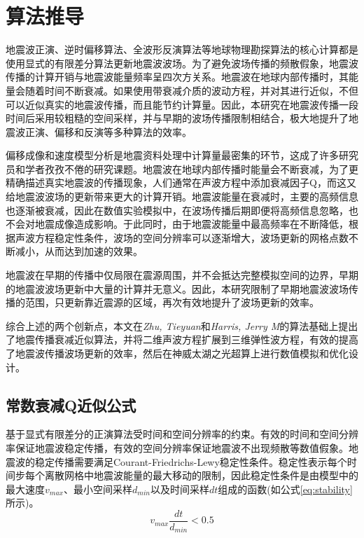 \documentclass[degree=doctor]{thuthesis}
\begin{document}
\section{算法推导}

地震波正演、逆时偏移算法、全波形反演算法等地球物理勘探算法的核心计算都是使用显式的有限差分算法更新地震波波场。为了避免波场传播的频散假象，地震波传播的计算开销与地震波能量频率呈四次方关系。地震波在地球内部传播时，其能量会随着时间不断衰减。如果使用带衰减介质的波动方程，并对其进行近似，不但可以近似真实的地震波传播，而且能节约计算量。因此，本研究在地震波传播一段时间后采用较粗糙的空间采样，并与早期的波场传播限制相结合，极大地提升了地震波正演、偏移和反演等多种算法的效率。

偏移成像和速度模型分析是地震资料处理中计算量最密集的环节，这成了许多研究员和学者孜孜不倦的研究课题\cite{bednar2002limited,stork2013eliminating}。地震波在地球内部传播时能量会不断衰减，为了更精确描述真实地震波的传播现象，人们通常在声波方程中添加衰减因子Q，而这又给地震波波场的更新带来更大的计算开销。地震波能量在衰减时，主要的高频信息也逐渐被衰减，因此在数值实验模拟中，在波场传播后期即便将高频信息忽略，也不会对地震成像造成影响。于此同时，由于地震波能量中最高频率在不断降低，根据声波方程稳定性条件，波场的空间分辨率可以逐渐增大，波场更新的网格点数不断减小，从而达到加速的效果。

地震波在早期的传播中仅局限在震源周围，并不会抵达完整模拟空间的边界，早期的地震波波场更新中大量的计算并无意义。因此，本研究限制了早期地震波波场传播的范围，只更新靠近震源的区域，再次有效地提升了波场更新的效率。

综合上述的两个创新点，本文在\emph{Zhu, Tieyuan}和\emph{Harris, Jerry M}\cite{zhu2014modeling}的算法基础上提出了地震传播衰减近似算法，并将二维声波方程扩展到三维弹性波方程，有效的提高了地震波传播波场更新的效率，然后在神威太湖之光超算上进行数值模拟和优化设计。

\subsection{常数衰减Q近似公式}

基于显式有限差分的正演算法受时间和空间分辨率的约束。有效的时间和空间分辨率保证地震波稳定传播，有效的空间分辨率保证地震波不出现频散等数值假象。地震波的稳定传播需要满足Courant-Friedrichs-Lewy稳定性条件\cite{courant1967partial}。稳定性表示每个时间步每个离散网格中地震波能量的最大移动的限制，因此稳定性条件是由模型中的最大速度$v_{max}$、最小空间采样$d_{min}$以及时间采样$dt$组成的函数(如公式\ref{eq:stability}所示)。
\begin{equation}
  v_{max} \frac{dt}{d_{min}} < 0.5
  \label{eq:stability}
\end{equation}
\end{document}
